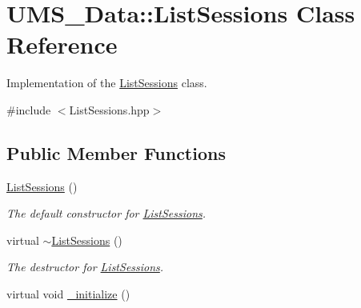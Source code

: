 \hypertarget{classUMS__Data_1_1ListSessions}{
\section{UMS\_\-Data::ListSessions Class Reference}
\label{classUMS__Data_1_1ListSessions}
}


Implementation of the \hyperlink{classUMS__Data_1_1ListSessions}{ListSessions} class.  




{\ttfamily \#include $<$ListSessions.hpp$>$}

\subsection*{Public Member Functions}
\begin{DoxyCompactItemize}
\item 
\hypertarget{classUMS__Data_1_1ListSessions_a1ff9de384ad30d154f77e494194a6e44}{
\hyperlink{classUMS__Data_1_1ListSessions_a1ff9de384ad30d154f77e494194a6e44}{ListSessions} ()}
\label{classUMS__Data_1_1ListSessions_a1ff9de384ad30d154f77e494194a6e44}

\begin{DoxyCompactList}\small\item\em The default constructor for \hyperlink{classUMS__Data_1_1ListSessions}{ListSessions}. \item\end{DoxyCompactList}\item 
\hypertarget{classUMS__Data_1_1ListSessions_a982bd78a86110cedbfc3bcd0cb653f0a}{
virtual \hyperlink{classUMS__Data_1_1ListSessions_a982bd78a86110cedbfc3bcd0cb653f0a}{$\sim$ListSessions} ()}
\label{classUMS__Data_1_1ListSessions_a982bd78a86110cedbfc3bcd0cb653f0a}

\begin{DoxyCompactList}\small\item\em The destructor for \hyperlink{classUMS__Data_1_1ListSessions}{ListSessions}. \item\end{DoxyCompactList}\item 
\hypertarget{classUMS__Data_1_1ListSessions_ada3bfb8a6e0c4521fd0da8ee1c496dbf}{
virtual void \hyperlink{classUMS__Data_1_1ListSessions_ada3bfb8a6e0c4521fd0da8ee1c496dbf}{\_\-initialize} ()}
\label{classUMS__Data_1_1ListSessions_ada3bfb8a6e0c4521fd0da8ee1c496dbf}


\end{DoxyCompactItemize}
